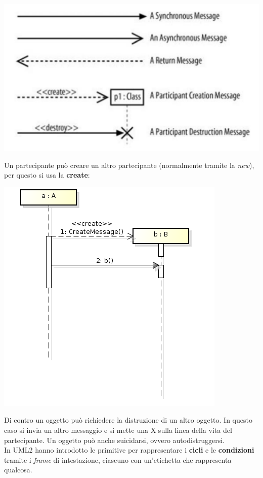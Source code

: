 \begin{center}

\includegraphics[width=0.75\columnwidth]{img5} %

\end{center}

Un partecipante può creare un altro partecipante (normalmente tramite la \textit{new}), per questo si usa la \textbf{create}:

\begin{center}

\includegraphics[width=0.75\columnwidth]{img7} %

\end{center}

Di contro un oggetto può richiedere la distruzione di un altro oggetto. In questo caso si invia un altro messaggio e si mette una X sulla linea della vita del partecipante. Un oggetto può anche suicidarsi, ovvero autodistruggersi.\\
In UML2 hanno introdotto le primitive per rappresentare i \textbf{cicli} e le \textbf{condizioni} tramite i \textit{frame} di intestazione, ciascuno con un'etichetta che rappresenta qualcosa.

